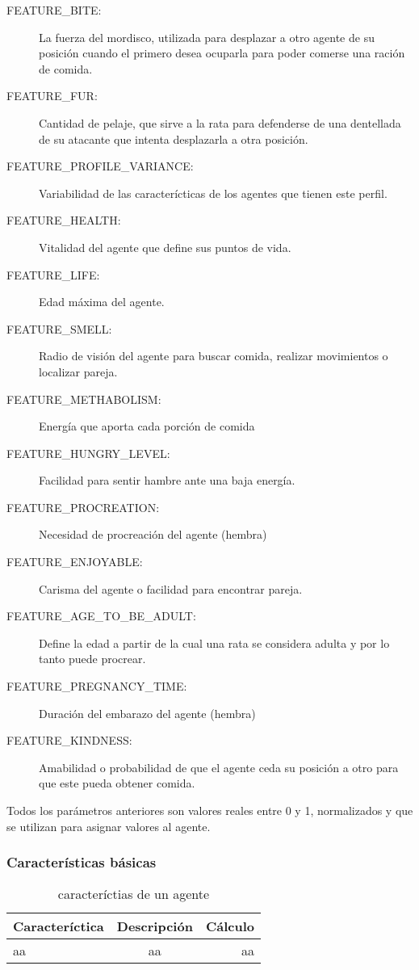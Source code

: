 \begin{description}
\item[FEATURE\_BITE:] La fuerza del mordisco, utilizada para desplazar a otro agente de su posición cuando el primero desea ocuparla para poder comerse una ración de comida.
\item[FEATURE\_FUR:] Cantidad de pelaje, que sirve a la rata para defenderse de una dentellada de su atacante que intenta desplazarla a otra posición.
\item[FEATURE\_PROFILE\_VARIANCE:] Variabilidad de las caracterícticas de los agentes que tienen este perfil.
\item[FEATURE\_HEALTH:] Vitalidad del agente que define sus puntos de vida.
\item[FEATURE\_LIFE:] Edad máxima del agente.
\item[FEATURE\_SMELL:] Radio de visión del agente para buscar comida, realizar movimientos o localizar pareja.
\item[FEATURE\_METHABOLISM:] Energía que aporta cada porción de comida
\item[FEATURE\_HUNGRY\_LEVEL:] Facilidad para sentir hambre ante una baja energía.
\item[FEATURE\_PROCREATION:] Necesidad de procreación del agente (hembra)
\item[FEATURE\_ENJOYABLE:] Carisma del agente o facilidad para encontrar pareja.
\item[FEATURE\_AGE\_TO\_BE\_ADULT:] Define la edad a partir de la cual una rata se considera adulta y por lo tanto puede procrear.
\item[FEATURE\_PREGNANCY\_TIME:] Duración del embarazo del agente (hembra)
\item[FEATURE\_KINDNESS:] Amabilidad o probabilidad de que el agente ceda su posición a otro para que este pueda obtener comida.
\end{description} 

Todos los parámetros anteriores son valores reales entre 0 y 1, normalizados y que se utilizan para asignar valores al agente.

\subsubsection{Características básicas}


\begin{table}[h]
\caption{caracteríctias de un agente} %
\centering %
\begin{tabular}{| l | c | r |} %
\hline\hline
Caracteríctica & Descripción & Cálculo\\
\hline %
aa & aa & aa\\
\hline %
\end{tabular}
\label{tab:caracteristicas}
\end{table}


